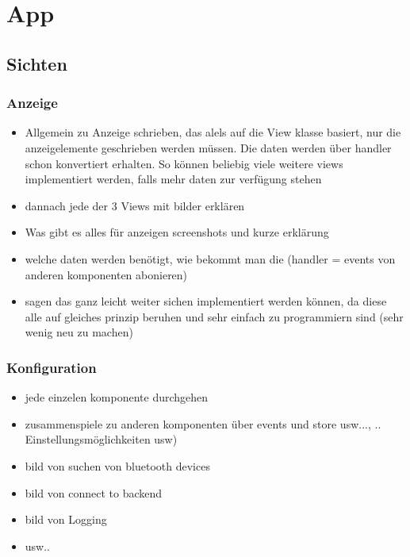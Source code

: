 \section{App}

\subsection{Sichten}

\subsubsection{Anzeige}
\label{sec:appSichtAnzeige}


\begin{itemize}
\item Allgemein zu Anzeige schrieben, das alels auf die View klasse basiert, nur die anzeigelemente geschrieben werden müssen. Die daten werden über handler schon konvertiert erhalten. So können beliebig viele weitere views implementiert werden, falls mehr daten zur verfügung stehen
\item dannach jede der 3 Views mit bilder erklären

\item Was gibt es alles für anzeigen screenshots und kurze erklärung
\item welche daten werden benötigt, wie bekommt man die (handler = events von anderen komponenten abonieren) 
\item sagen das ganz leicht weiter sichen implementiert werden können, da diese alle auf gleiches prinzip beruhen und sehr einfach zu programmiern sind (sehr wenig neu zu machen)
\end{itemize}

\subsubsection{Konfiguration}
\label{sec:appSichtKonfiguration}


\begin{itemize}
\item jede einzelen komponente durchgehen
\item zusammenspiele zu anderen komponenten über events und store usw..., .. Einstellungsmöglichkeiten usw)
\item bild von suchen von bluetooth devices
\item bild von connect to backend
\item bild von Logging
\item usw..
\end{itemize}


